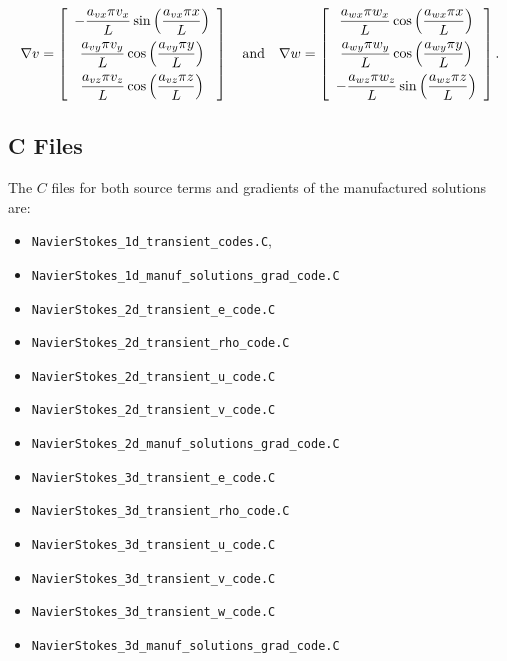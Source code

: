 \documentclass[10pt]{article}
\begin{document}
\begin{equation*}
\nabla  v= \left[ \begin{array}{c}
-  \dfrac{  a_{vx}  \pi v_x}{L}  \sin\left( \dfrac{ a_{vx}  \pi  x}{L}\right)\vspace{5pt}\\
    \dfrac{  a_{vy}  \pi v_y}{L} \cos\left( \dfrac{ a_{vy}  \pi  y}{L}\right)\vspace{5pt}\\
   \dfrac{  a_{vz}  \pi v_z }{L} \cos\left( \dfrac{ a_{vz}  \pi  z}{L}\right)
\end{array} \right]
\quad\mbox{and}\quad
\nabla w = \left[ \begin{array}{c}
\dfrac{  a_{wx}  \pi  w_x}{L} \cos\left( \dfrac{ a_{wx}  \pi  x}{L}\right)\vspace{5pt}\\
  \dfrac{  a_{wy}  \pi w_y}{L}  \cos\left( \dfrac{ a_{wy}  \pi  y}{L}\right)\vspace{5pt} \\
 - \dfrac{  a_{wz}  \pi w_z}{L}  \sin\left( \dfrac{ a_{wz}  \pi  z}{L}\right)
\end{array} \right].
\end{equation*}


\subsection{C Files}
The $C$ files for both source terms and gradients of the  manufactured solutions are:
\begin{itemize}
 \item \texttt{NavierStokes\_1d\_transient\_codes.C},
 \item \texttt{NavierStokes\_1d\_manuf\_solutions\_grad\_code.C}
 \item \texttt{NavierStokes\_2d\_transient\_e\_code.C}
 \item \texttt{NavierStokes\_2d\_transient\_rho\_code.C}
 \item \texttt{NavierStokes\_2d\_transient\_u\_code.C}
 \item \texttt{NavierStokes\_2d\_transient\_v\_code.C}
 \item \texttt{NavierStokes\_2d\_manuf\_solutions\_grad\_code.C}
 \item \texttt{NavierStokes\_3d\_transient\_e\_code.C}
 \item \texttt{NavierStokes\_3d\_transient\_rho\_code.C}
 \item \texttt{NavierStokes\_3d\_transient\_u\_code.C}
 \item \texttt{NavierStokes\_3d\_transient\_v\_code.C}
 \item \texttt{NavierStokes\_3d\_transient\_w\_code.C}
 \item \texttt{NavierStokes\_3d\_manuf\_solutions\_grad\_code.C}
\end{itemize}
\end{document}

